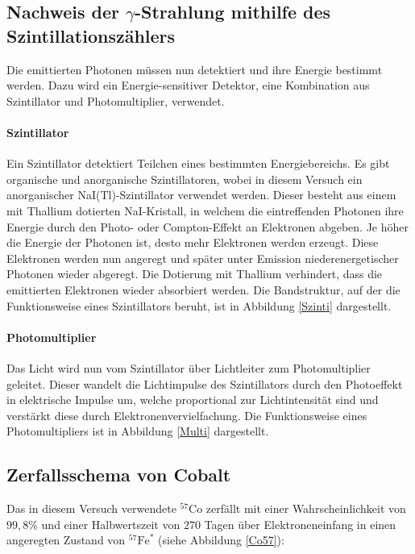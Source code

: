  \subsection{Nachweis der $\gamma$-Strahlung mithilfe des Szintillationszählers}
 Die emittierten Photonen müssen nun detektiert und ihre Energie bestimmt werden. Dazu wird ein Energie-sensitiver Detektor, eine Kombination aus Szintillator und Photomultiplier, verwendet.
 \paragraph{Szintillator} Ein Szintillator detektiert Teilchen eines bestimmten Energiebereichs. Es gibt organische und anorganische Szintillatoren, wobei in diesem Versuch ein anorganischer NaI(Tl)-Szintillator verwendet werden. Dieser besteht aus einem mit Thallium dotierten NaI-Kristall, in welchem die eintreffenden Photonen ihre Energie durch den Photo- oder Compton-Effekt an Elektronen abgeben. Je höher die Energie der Photonen ist, desto mehr Elektronen werden erzeugt. Diese Elektronen werden nun angeregt und später unter Emission  niederenergetischer Photonen wieder abgeregt. Die Dotierung mit Thallium verhindert, dass die emittierten Elektronen wieder absorbiert werden. Die Bandstruktur, auf der die Funktionsweise eines Szintillators beruht, ist in Abbildung \ref{Szinti} dargestellt.\cite{szinti}
 
 \paragraph{Photomultiplier}
 Das Licht wird nun vom Szintillator über Lichtleiter zum Photomultiplier geleitet. Dieser wandelt die Lichtimpulse des Szintillators durch den Photoeffekt in elektrische Impulse um, welche proportional zur Lichtintensität sind und verstärkt diese durch Elektronenvervielfachung. Die Funktionsweise eines Photomultipliers ist in Abbildung \ref{Multi} dargestellt.\cite{PM}
 

\subsection{Zerfallsschema von Cobalt}

Das in diesem Versuch verwendete $^{57}$Co zerfällt mit einer Wahrscheinlichkeit von $99,8\%$ und einer Halbwertszeit von $270$ Tagen über Elektroneneinfang in einen angeregten Zustand von $^{57}\mathrm{Fe}^*$ (siehe Abbildung \ref{Co57}):

